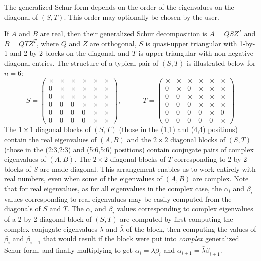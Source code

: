 The generalized Schur form depends on the order of the eigenvalues on the
diagonal of $(S,T)$. This order may optionally be chosen by the user.

If $A$ and $B$ are real, then their generalized Schur decomposition
is $A = QSZ^T$ and $B = QTZ^T$, where $Q$ and $Z$ are orthogonal,
$S$ is quasi-upper triangular with 1-by-1 and 2-by-2 blocks on the
diagonal, and $T$ is upper triangular with non-negative diagonal entries.
The structure of a typical pair of $(S,T)$ is illustrated below for $n=6$:
\[
S = \left( \begin{array}{cccccc}
  \times  & \times  & \times  & \times  & \times  & \times   \\
  0 & \times  & \times  & \times  & \times  & \times   \\
  0 & \times  & \times  & \times  & \times  & \times   \\
  0 & 0 & 0 & \times  & \times  & \times   \\
  0 & 0 & 0 & 0 & \times  & \times   \\
  0 & 0 & 0 & 0 & \times  & \times
\end{array} \right), \quad\quad\quad
T = \left( \begin{array}{cccccc}
  \times  & \times  & \times  & \times  & \times  & \times   \\
  0 & \times  & 0  & \times  & \times  & \times   \\
  0 &  0      & \times  & \times  & \times  & \times   \\
  0 & 0 & 0 & \times  & \times  & \times   \\
  0 & 0 & 0 & 0 & \times  & 0        \\
  0 & 0 & 0 & 0 & 0       & \times
\end{array} \right)
\]
The $1 \times 1$ diagonal blocks of $(S,T)$
(those in the (1,1) and (4,4) positions)
contain the real eigenvalues of $(A,B)$ and
the $2 \times 2$ diagonal blocks of $(S,T)$
(those in the (2:3,2:3) and (5:6,5:6) positions)
contain conjugate pairs of complex eigenvalues of $(A,B)$.
The $2 \times 2$ diagonal blocks of $T$ corresponding to 2-by-2
blocks of $S$ are made diagonal.
This arrangement enables us to work entirely with real numbers, even when
some of the eigenvalues of $(A,B)$ are complex.
Note that for real eigenvalues, as for all eigenvalues in the complex case,
the $\alpha_i$ and $\beta_i$ values corresponding to real eigenvalues may be
easily computed from the diagonals of $S$ and $T$.  The $\alpha_i$ and
$\beta_i$ values corresponding to complex eigenvalues
of a 2-by-2 diagonal block of $(S,T)$
are computed by first
computing the complex conjugate eigenvalues $\lambda$ and $\bar{\lambda}$
of the block,
then computing the values of $\beta_i$ and $\beta_{i+1}$ that would
result if the block were put into {\em complex} generalized
Schur form, and finally multiplying to get
$\alpha_i = \lambda \beta_i$ and $\alpha_{i+1}=\bar{\lambda}\beta_{i+1}$.\\


